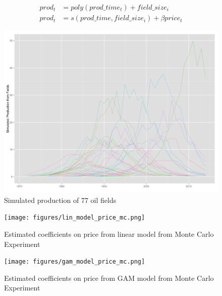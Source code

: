 \documentclass{beamer}
\begin{document}
\begin{frame}
	\begin{equation}
		\begin{split}
		prod_t&=poly(prod\_time_t) + field\_size_i \\
		prod_t&=s(prod\_time,field\_size_i) + \beta price_t
		\end{split}
	\end{equation}
\end{frame}

\begin{frame}[plain]
	\begin{figure}
		\includegraphics[width=1\textwidth]{figures/simulated_production.png}
		\caption{Simulated production of 77 oil fields}
		\label{simulated_production}	
	\end{figure}
\end{frame}

\begin{frame}[plain]
	\begin{figure}
		\texttt{[image: figures/lin\_model\_price\_mc.png]}
		\caption{Estimated coefficients on price from linear model from Monte Carlo Experiment}
		\label{lin_model_price_mc}	
	\end{figure}
\end{frame}

\begin{frame}[plain]
	\begin{figure}
		\texttt{[image: figures/gam\_model\_price\_mc.png]}
		\caption{Estimated coefficients on price from GAM model from Monte Carlo Experiment}
		\label{gam_model_price_mc.png}	
	\end{figure}
\end{frame}
\end{document}
